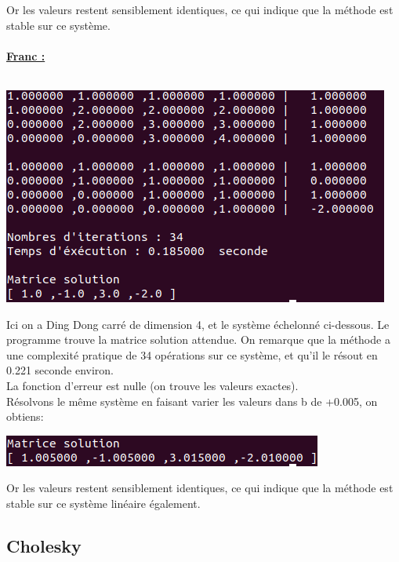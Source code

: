 \documentclass[a4paper]{article}
\begin{document}
Or les valeurs restent sensiblement identiques, ce qui indique que la méthode est stable sur ce système.
\\
\\
\textbf{\underline{\large{Franc :}}}
\\
\\
\begin{center}
	\includegraphics[scale=0.5]{./img/gauss/TestFranc.png} \\
\end{center}

Ici on a Ding Dong carré de dimension 4, et le système échelonné ci-dessous.
Le programme trouve la matrice solution attendue.
On remarque que la méthode a une complexité pratique de 34 opérations sur ce système, et qu'il le résout en 0.221 seconde environ.
\\
La fonction d'erreur est nulle (on trouve les valeurs exactes).\\
Résolvons le même système en faisant varier les valeurs dans b de +0.005, on obtiens:
\\
\begin{center}
	\includegraphics[scale=0.5]{./img/gauss/franc005.png} \\
\end{center}

Or les valeurs restent sensiblement identiques, ce qui indique que la méthode
est stable sur ce système linéaire également.

\clearpage

\subsection{Cholesky}
\end{document}
